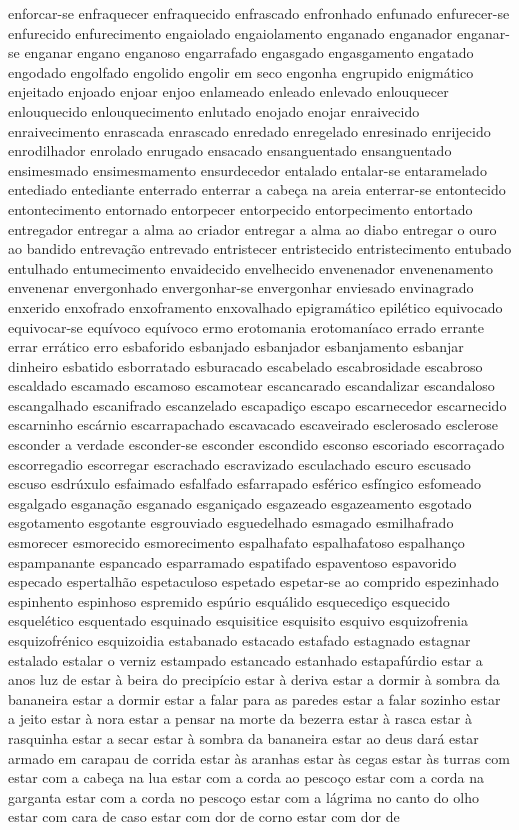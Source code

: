 enforcar-se enfraquecer enfraquecido enfrascado enfronhado enfunado enfurecer-se enfurecido enfurecimento engaiolado engaiolamento enganado enganador enganar-se enganar engano enganoso engarrafado engasgado engasgamento engatado engodado engolfado engolido engolir em seco engonha engrupido enigm\'{a}tico enjeitado enjoado enjoar enjoo enlameado enleado enlevado enlouquecer enlouquecido enlouquecimento enlutado enojado enojar enraivecido enraivecimento enrascada enrascado enredado enregelado enresinado enrijecido enrodilhador enrolado enrugado ensacado ensanguentado ensanguentado ensimesmado ensimesmamento ensurdecedor entalado entalar-se entaramelado entediado entediante enterrado enterrar a cabe\c{c}a na areia enterrar-se entontecido entontecimento entornado entorpecer entorpecido entorpecimento entortado entregador entregar a alma ao criador entregar a alma ao diabo entregar o ouro ao bandido entreva\c{c}\~ao entrevado entristecer entristecido entristecimento entubado entulhado entumecimento envaidecido envelhecido envenenador envenenamento envenenar envergonhado envergonhar-se envergonhar enviesado envinagrado enxerido enxofrado enxoframento enxovalhado epigram\'{a}tico epil\'{e}tico equivocado equivocar-se equ\'{i}voco equ\'{i}voco ermo erotomania erotoman\'{i}aco errado errante errar err\'{a}tico erro esbaforido esbanjado esbanjador esbanjamento esbanjar dinheiro esbatido esborratado esburacado escabelado escabrosidade escabroso escaldado escamado escamoso escamotear escancarado escandalizar escandaloso escangalhado escanifrado escanzelado escapadi\c{c}o escapo escarnecedor escarnecido escarninho esc\'{a}rnio escarrapachado escavacado escaveirado esclerosado esclerose esconder a verdade esconder-se esconder escondido esconso escoriado escorra\c{c}ado escorregadio escorregar escrachado escravizado esculachado escuro escusado escuso esdr\'{u}xulo esfaimado esfalfado esfarrapado esf\'{e}rico esf\'{i}ngico esfomeado esgalgado esgana\c{c}\~ao esganado esgani\c{c}ado esgazeado esgazeamento esgotado esgotamento esgotante esgrouviado esguedelhado esmagado esmilhafrado esmorecer esmorecido esmorecimento espalhafato espalhafatoso espalhan\c{c}o espampanante espancado esparramado espatifado espaventoso espavorido especado espertalh\~ao espetaculoso espetado espetar-se ao comprido espezinhado espinhento espinhoso espremido esp\'{u}rio esqu\'{a}lido esquecedi\c{c}o esquecido esquel\'{e}tico esquentado esquinado esquisitice esquisito esquivo esquizofrenia esquizofr\'{e}nico esquizoidia estabanado estacado estafado estagnado estagnar estalado estalar o verniz estampado estancado estanhado estapaf\'{u}rdio estar a anos luz de estar \`{a} beira do precip\'{i}cio estar \`{a} deriva estar a dormir \`{a} sombra da bananeira estar a dormir estar a falar para as paredes estar a falar sozinho estar a jeito estar \`{a} nora estar a pensar na morte da bezerra estar \`{a} rasca estar \`{a} rasquinha estar a secar estar \`{a} sombra da bananeira estar ao deus dar\'{a} estar armado em carapau de corrida estar \`{a}s aranhas estar \`{a}s cegas estar \`{a}s turras com estar com a cabe\c{c}a na lua estar com a corda ao pesco\c{c}o estar com a corda na garganta estar com a corda no pesco\c{c}o estar com a l\'{a}grima no canto do olho estar com cara de caso estar com dor de corno estar com dor de 